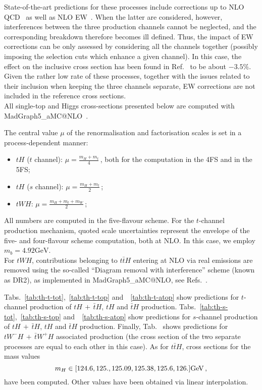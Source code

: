 State-of-the-art predictions
for these processes include corrections up to NLO QCD~\cite{Demartin:2015uha,Demartin:2016axk} as well as NLO EW~\cite{Pagani:2020mov}. When
the latter are considered, however, interferences between the three production channels cannot be neglected, and the corresponding breakdown 
therefore becomes ill defined. Thus, the impact of EW corrections can be only assessed
by considering all the channels together (possibly imposing the selection cuts which enhance a given channel). In this case, the effect on the inclusive
cross section has been found in Ref.~\cite{Pagani:2020mov} to be about $-3.5\%$. Given the rather low rate of these processes, together with
the issues related to their inclusion when keeping the three channels separate, EW
corrections are not included in the reference cross sections.\\

All single-top and Higgs cross-sections presented below are computed with {\sc MadGraph5\_aMC@NLO}~\cite{Alwall:2014hca,Frederix:2018nkq}. 

The central value $\mu$ of the renormalisation and factorisation scales is set in a process-dependent manner:
\begin{itemize}
    \item $tH$ ($t$ channel): $\mu= \frac{m_H+m_t}{4}\,$, both for the computation in the 4FS and in the 5FS;
    \item $tH$ ($s$ channel): $\mu= \frac{m_H+m_t}{2}\,$;
    \item $tWH$: $\mu= \frac{m_H+m_t+m_W}{2}\,$;
\end{itemize}
All numbers are computed in the five-flavour scheme. For the $t$-channel production mechanism, quoted scale uncertainties represent the envelope of the
five- and four-flavour scheme computation, both at NLO. In this case, we employ $m_b=4.92 \textrm{GeV}$.\\
For $tWH$, contributions belonging to $t\bar t H$ entering at NLO via real emissions are removed using the so-called ``Diagram removal with interference'' 
scheme (known as DR2), as implemented in {\sc MadGraph5\_aMC@NLO}, see Refs.~\cite{Demartin:2016axk,Frixione:2019fxg}.

Tabs.~\ref{tab:th-t-tot},~\ref{tab:th-t-top} and~~\ref{tab:th-t-atop}
show predictions for $t$-channel production of $tH\,+\,\bar tH$, $tH$ and $\bar tH$ production. Tabs.~\ref{tab:th-s-tot},~\ref{tab:th-s-top} and~~\ref{tab:th-s-atop}
show predictions for $s$-channel production of $tH\,+\,\bar tH$, $tH$ and $\bar tH$ production. Finally, Tab.~\label{tab:thw-tot}
shows predictions for $tW^-H \,+ \,\bar t W^+H$ associated production (the cross section of the two separate processes are equal to each other in this case).
As for $t\bar t H$, cross sections
for the mass values
\begin{equation}
    m_H \in [ 124.6, 125., 125.09, 125.38, 125.6, 126.] \rm GeV\,,
\end{equation}
have been computed. Other values have been obtained via linear interpolation.



